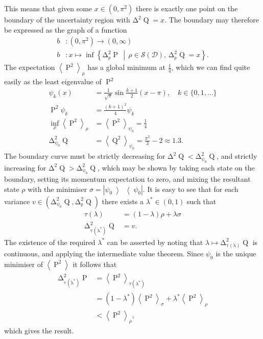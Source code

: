\documentclass[prb,amsmath,amssymb,notitlepage]{revtex4-1}
\newcommand{\var}[2]{\operatorname{\Delta^{\!2}_{{#2}}} #1}
\newcommand{\expr}[1]{\left\langle #1\right\rangle_\rho} %
\newcommand{\expe}[2]{\left\langle #1\right\rangle_{#2}}
\newcommand{\ketbra}[2]{\left| #1 \middle\rangle\middle\langle #2 \right|}
\newcommand{\dop}[1]{\mathcal{S}\left(#1\right)}
\newcommand{\ps}[1]{\psi_{#1}}
\DeclareMathOperator{\opp}{P}
\DeclareMathOperator{\opq}{Q}
\begin{document}
This means that given some $x\in (0,\pi^2)$ there is exactly one point on the boundary of the uncertainty region with $\var{\opq}{} = x$. The boundary may therefore be expressed as the graph of a function
\begin{align}
	b&:(0,\pi^2) \to \left(0, \infty\right)\\
	b&:x \mapsto \inf \left\{\var{\opp}{\rho}\,\middle|\,\rho\in\dop{\mathcal{D}},\, \var{\opq}{\rho} = x\right\}.
\end{align}
The expectation $\expr{\opp^2}$ has a global minimum at $\frac{1}{4}$, which we can find quite easily as the least eigenvalue of $\opp^2$
\begin{align}
	\ps{k}(x) &= \frac{1}{\sqrt{\pi}} \sin \frac{k+1}{2}(x - \pi),\quad k\in\{0,1,...\}\\
	\opp^2 \ps{k} &= \frac{(k+1)^2}{4} \ps{k}\\
	\inf_\rho \expr{\opp^2} &= \expe{\opp^2}{\ps{0}} = \frac{1}{4}\\
	\var{\opq}{\ps{0}} &= \expe{\opq^2}{\ps{0}} = \frac{\pi^2}{3} - 2 \approx 1.3.
\end{align}
The boundary curve must be strictly decreasing for $\var{\opq}{} < \var{\opq}{\ps{0}}$, and strictly increasing for $\var{\opq}{} > \var{\opq}{\ps{0}}$, which may be shown by taking each state on the boundary, setting its momentum expectation to zero, and mixing the resultant state $\rho$ with the minimiser $\sigma=\ketbra{\ps{0}}{\ps{0}}$. It is easy to see that for each variance $v\in(\var{\opq}{\ps{0}}, \var{\opq}{\rho})$ there exists a $\lambda^*\in(0,1)$ such that 
\begin{align}
	\tau(\lambda) &= (1-\lambda) \rho + \lambda\sigma\\	
	\var{\opq}{\tau(\lambda^*)} &= v.
\end{align}
The existence of the required $\lambda^*$ can be asserted by noting that $\lambda\mapsto\var{\opq}{\tau(\lambda)}$ is continuous, and applying the intermediate value theorem. Since $\ps{0}$ is the unique minimiser of $\expe{\opp^2}{}$ it follows that
\begin{align}
	\var{\opp}{\tau(\lambda^*)} &= \expe{\opp^2}{\tau(\lambda^*)}\\
	&= (1-\lambda^*)\expe{\opp^2}{\sigma} + \lambda^*\expe{\opp^2}{\rho}\\
	&< \expe{\opp^2}{\rho},
\end{align}
which gives the result.
\end{document}
